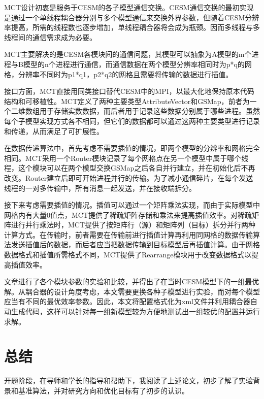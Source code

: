 	MCT设计初衷是服务于CESM的各子模型通信交换。CESM通信交换的最初实现是通过一个单线程耦合器分别与多个模型通信来交换外界参数，但随着CESM分辨率提高，所需的线程数也逐步增加，单线程耦合器将会成为瓶颈。因而多线程与多线程间的通信需求成为必要。

	MCT主要解决的是CESM各模块间的通信问题，其模型可以抽象为A模型的m个进程与B模型的n个进程进行通信，而通信数据在两个模型分辨率相同时为p*q的网格，分辨率不同时为p1*q1，p2*q2的网格且需要将传输的数据进行插值。

	接口方面，MCT直接用同类接口替代CESM中的MPI，以最大化地保持原本代码结构和可移植性。MCT定义了两种主要类型AttributeVector和GSMap，前者为一个二维数组用于存储实数数据，而后者用于记录这些数据分别属于哪些进程。虽然每个子模型实现方式各不相同，但它们的数据都可以通过这两种主要类型进行记录和传递，从而满足了可扩展性。

	在数据传递算法中，首先考虑不需要插值的情况，即两个模型的分辨率和网格完全相同。MCT采用一个Router模块记录了每个网格点在另一个模型中属于哪个线程，这个模块可以在两个模型交换GSMap之后各自并行建立，并在初始化后不再改变。Router建立后即可开始进程并行的传输。为了减小通信碎片，在每个发送线程的一对多传输中，所有消息一起发送，并在接收端拆分。

	接下来考虑需要插值的情况。插值可以通过一个矩阵乘法实现，而由于实际模型中网格内有大量0值点，MCT提供了稀疏矩阵存储和乘法来提高插值效率。对稀疏矩阵进行并行乘法时，MCT提供了按矩阵行（源）和矩阵列（目标）拆分并行两种计算方式。在传输时，前者需要在传输前进行插值计算再利用同网格的数据传输算法发送插值后的数据，而后者应当把数据传输到目标模型后再插值计算。由于网格数据格式和插值所需格式不同，MCT提供了Rearrange模块用于改变数据格式以提高插值效率。

	文章进行了各个模块参数的实验和比较，并得出了在当时CESM模型下的一组最优解。从耦合器的设计角度考虑，本文需要更换各种子模型进行实验，而对每个模型应当有不同的最优效率参数。因此，本文将配置格式化为xml文件并利用耦合器自动生成代码，这样可以针对每一组新模型较为方便地测试出一组较优的配置并运行求解。

\section{总结}

开题阶段，在导师和学长的指导和帮助下，我阅读了上述论文，初步了解了实验背景和基准算法，并对研究方向和优化目标有了初步的认识。

